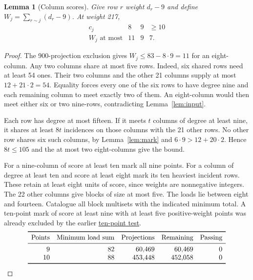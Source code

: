 \documentclass[11pt]{article}
\newtheorem{lemma}[theorem]{Lemma}
\newcommand{\proofdir}[2]{\href{https://github.com/jasondavies/zarankiewicz-numbers/blob/b33dcd207d62331adc02e1cb6ef0021094ebd40b/#1}{#2}}
\begin{document}
\begin{lemma}[Column scores]\label{lem:score}
Give row $r$ weight $d_r-9$ and define $W_j=\sum_{r\sim j}(d_r-9)$.
At weight 217,
\[
\begin{array}{c|ccc}
c_j&8&9&\ge10\\ \hline
W_j\text{ at most}&11&9&7 .
\end{array}
\]
\end{lemma}
\begin{proof}
The 900-projection exclusion gives $W_j\le83-8\cdot9=11$ for an
eight-column. Any two columns share at most five rows. Indeed, six
shared rows need at least 54 ones. Their two columns and the other
21 columns supply at most $12+21\cdot2=54$. Equality forces every
one of the six rows to have degree nine and each remaining column to
meet exactly two of them. An eight-column would then meet either six
or two nine-rows, contradicting Lemma~\ref{lem:input}.

Each row has degree at most fifteen. If it meets $t$ columns of degree
at least nine, it shares at least $8t$ incidences on those columns
with the 21 other rows. No other row shares six such columns, by
Lemma~\ref{lem:mark} and $6\cdot9>12+20\cdot2$. Hence $8t\le105$ and
the at most two eight-columns give the bound.

For a nine-column of score at least ten mark all nine points. For a
column of degree at least ten and score at least eight mark its ten
heaviest incident rows. These retain at least eight units of score,
since weights are nonnegative integers. The 22 other columns give
blocks of size at most five. The loads lie between eight and fourteen.
Catalogue all block multisets with the indicated minimum total.
A ten-point mark of score at least nine with at least five
positive-weight points was already excluded by the earlier
\proofdir{z22x23-k33/min9.md}{ten-point test}.
\[
\begin{array}{rrrrr}
\toprule
\text{Points}&\text{Minimum load sum}&\text{Projections}&
  \text{Remaining}&\text{Passing}\\
\midrule
9&82&60{,}469&60{,}469&0\\
10&88&453{,}448&452{,}058&0\\
\bottomrule
\end{array}
\]


\end{proof}
\end{document}
